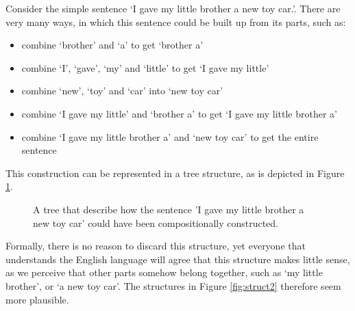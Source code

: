 \documentclass{report}
\theoremstyle{definition}
\theoremstyle{plain}
\begin{document}
Consider the simple sentence `I gave my little brother a new toy car.'. There are very many ways, in which this sentence could be built up from its parts, such as:\begin{itemize}
\item combine `brother' and `a' to get `brother a'
\item combine `I', `gave', `my' and `little' to get `I gave my little'
\item combine `new', `toy' and `car' into `new toy car'
\item combine `I gave my little' and `brother a' to get `I gave my little brother a'
\item combine `I gave my little brother a' and `new toy car' to get the entire sentence
\end{itemize}

This construction can be represented in a tree structure, as is depicted in Figure \ref{fig:struct1}.

\begin{figure}[!ht]
\centering
{}
\caption{A tree that describe how the sentence 'I gave my little brother a new toy car' could have been compositionally constructed.}\label{fig:struct1}
\end{figure}

Formally, there is no reason to discard this structure, yet everyone that understands the English language will agree that this structure makes little sense, as we perceive that other parts somehow belong together, such as `my little brother', or `a new toy car'. The structures in Figure \ref{fig:struct2} therefore seem more plausible.
\end{document}
